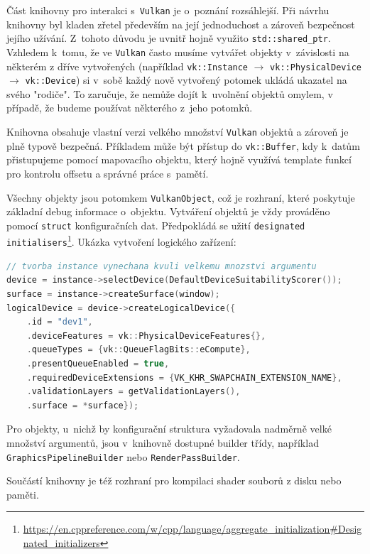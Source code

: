 Část knihovny pro interakci s~\texttt{Vulkan} je o~poznání rozsáhlejší. Při návrhu knihovny byl kladen zřetel především na její jednoduchost a zároveň bezpečnost jejího užívání. Z~tohoto důvodu je uvnitř hojně využito \texttt{std::shared\_ptr}. Vzhledem k~tomu, že ve \texttt{Vulkan} často musíme vytvářet objekty v~závislosti na některém z dříve vytvořených (například \texttt{vk::Instance} $\longrightarrow$ \texttt{vk::PhysicalDevice} $\longrightarrow$ \texttt{vk::Device}) si v~sobě každý nově vytvořený potomek ukládá ukazatel na svého "rodiče". To zaručuje, že nemůže dojít k~uvolnění objektů omylem, v případě, že budeme používat některého z~jeho potomků.

Knihovna obsahuje vlastní verzi velkého množství \texttt{Vulkan} objektů a zároveň je plně typově bezpečná. Příkladem může být přístup do \texttt{vk::Buffer}, kdy k~datům přistupujeme pomocí mapovacího objektu, který hojně využívá template funkcí pro kontrolu offsetu a správné práce s~pamětí.

Všechny objekty jsou potomkem \texttt{VulkanObject}, což je rozhraní, které poskytuje základní debug informace o~objektu. Vytváření objektů je vždy prováděno pomocí \texttt{struct} konfiguračních dat. Předpokládá se užití \texttt{designated initialisers}\footnote{\url{https://en.cppreference.com/w/cpp/language/aggregate_initialization#Designated_initializers}}. Ukázka vytvoření logického zařízení:

\begin{lstlisting}[language=C++, caption={Tvorba logického zařízení}]
// tvorba instance vynechana kvuli velkemu mnozstvi argumentu
device = instance->selectDevice(DefaultDeviceSuitabilityScorer());
surface = instance->createSurface(window);
logicalDevice = device->createLogicalDevice({
    .id = "dev1",
    .deviceFeatures = vk::PhysicalDeviceFeatures{},
    .queueTypes = {vk::QueueFlagBits::eCompute},
    .presentQueueEnabled = true,
    .requiredDeviceExtensions = {VK_KHR_SWAPCHAIN_EXTENSION_NAME},
    .validationLayers = getValidationLayers(),
    .surface = *surface});
\end{lstlisting}

Pro objekty, u~nichž by konfigurační struktura vyžadovala nadměrně velké množství argumentů, jsou v~knihovně dostupné builder třídy, například \texttt{GraphicsPipelineBuilder} nebo \texttt{RenderPassBuilder}.

Součástí knihovny je též rozhraní pro kompilaci shader souborů z disku nebo paměti.



